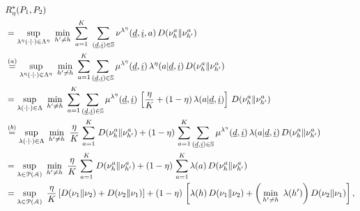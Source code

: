 \begin{align}
&R_\eta^*(P_1,P_2)\nonumber\\
&=\sup\limits_{\lambda^\eta(\cdot\mid\cdot)\in \Lambda^\eta}~ \min\limits_{h'\neq h} ~ \sum\limits_{a=1}^{K}~\sum\limits_{(\underline{d},\underline{i})\in\mathbb{S}}  \nu^{\lambda^\eta}(\underline{d},\underline{i},a) \,D(\nu_h^a\|\nu_{h'}^a)\nonumber\\
&\stackrel{(a)}{=}\sup\limits_{\lambda^\eta(\cdot\mid\cdot)\in \Lambda^\eta}~ \min\limits_{h'\neq h} ~\sum\limits_{a=1}^{K} \sum\limits_{(\underline{d},\underline{i})\in\mathbb{S}}\mu^{\lambda^\eta}(\underline{d},\underline{i})\,\lambda^\eta(a|\underline{d}, \underline{i})\,D(\nu_h^a\|\nu_{h'}^a)\nonumber\\
	&=\sup\limits_{\lambda(\cdot\mid\cdot)\in \Lambda}~ \min\limits_{h'\neq h} ~\sum\limits_{a=1}^{K} \sum\limits_{(\underline{d},\underline{i})\in\mathbb{S}}\mu^{\lambda^\eta}(\underline{d},\underline{i})\,\left[\frac{\eta}{K}+(1-\eta)\,\lambda(a|\underline{d},\underline{i})\right]\,D(\nu_h^a\|\nu_{h'}^a)\nonumber\\
	&\stackrel{(b)}{=}\sup\limits_{\lambda(\cdot\mid\cdot)\in \Lambda}~ \min\limits_{h'\neq h} ~\frac{\eta}{K}\,\sum\limits_{a=1}^{K} \,D(\nu_h^a\|\nu_{h'}^a)+(1-\eta)\,\sum\limits_{a=1}^{K} \sum\limits_{(\underline{d},\underline{i})\in\mathbb{S}}\mu^{\lambda^\eta}(\underline{d},\underline{i})\,\lambda(a|\underline{d},\underline{i})\,D(\nu_h^a\|\nu_{h'}^a)\nonumber\\
	&=\sup\limits_{\lambda\in \mathcal{P}(\mathcal{A})}~ \min\limits_{h'\neq h} ~\frac{\eta}{K}\,\sum\limits_{a=1}^{K} \,D(\nu_h^a\|\nu_{h'}^a)+(1-\eta)\,\sum\limits_{a=1}^{K} \lambda(a)\,D(\nu_h^a\|\nu_{h'}^a)\label{restless_with_known_eq:D^*(delta,P_1,P_2)_iid_arms_case}\\
	&={\color{black} \sup\limits_{\lambda\in \mathcal{P}(\mathcal{A})}~\frac{\eta}{K}\left[D(\nu_1\|\nu_2)+D(\nu_2\|\nu_1)\right]+(1-\eta)\,\left[\lambda(h)\,D(\nu_1\|\nu_2)+\bigg(\min\limits_{h'\neq h} ~\lambda(h')\bigg)\,D(\nu_2\|\nu_1)\right],}
	\label{restless_with_known_eq:D^*(delta,P_1,P_2)_iid_arms_case_1}
\end{align}\endgroup
